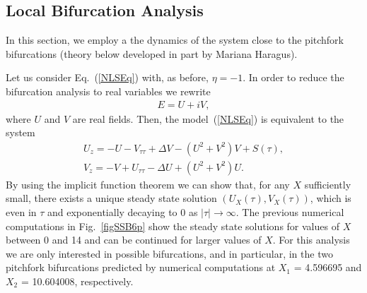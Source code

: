\subsection{Local Bifurcation Analysis
\label{secGalerkin}}

In this section, we employ a  
the dynamics of the system close to the pitchfork bifurcations (theory below developed in part by Mariana Haragus). 

Let us consider Eq.~(\ref{NLSEq}) with, as before, $\eta=-1$.
%
In order to reduce the bifurcation analysis to real variables we rewrite
\begin{align}
E = U + iV,
\label{realvar}
\end{align}
where $U$ and $V$ are real fields. Then, the model~(\ref{NLSEq})
is equivalent to the system
\begin{align}
U_z = -U -V_{\tau\tau} + \Delta V - (U^2 + V^2)V + S(\tau),\\
V_z = -V + U_{\tau\tau} - \Delta U + (U^2 + V^2) U.
\end{align}
%
By using the implicit function theorem we can show that, for any $X$ sufficiently small, there exists a unique steady state solution $(U_X(\tau), V_X(\tau))$, which is even in $\tau$ and exponentially decaying to 0 as $|\tau| \rightarrow \infty$.  The previous numerical computations in Fig.~\ref{figSSB6p} show the steady state solutions for values of $X$ between 0 and 14 and can be continued for larger values of $X$.  For this analysis we are only interested in possible bifurcations, and in particular, in the two pitchfork bifurcations predicted by numerical computations at $X_1$ = 4.596695 and $X_2$ = 10.604008, respectively.

